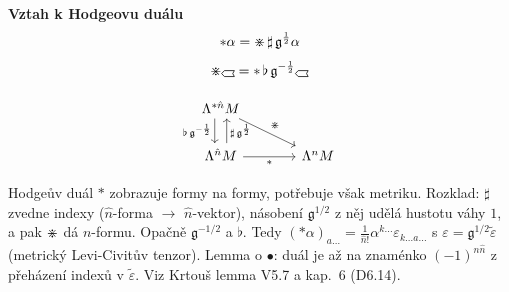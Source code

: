 \begin{minipage}{0.5\textwidth}
\textbf{Vztah k Hodgeovu duálu}
\[
  *\alpha = \mathord{\divideontimes}\,\sharp\,\mathfrak{g}^{\frac12}\alpha
\]
\[
  \gmIhdual\gmIhustsym = *\,\flat\,\mathfrak{g}^{-\frac12}\gmIhustsym
\]
\end{minipage}
\begin{minipage}{0.45\textwidth}
\[
  \begin{tikzcd}[column sep=large]
    \Lambda^{*\hat n}M \arrow[d, shift right=1ex, "\flat\,\mathfrak{g}^{-\frac12}"'] \arrow[rd, "\gmIhdual"] & \\
    \Lambda^{\hat n}M \arrow[u, shift right=1ex, "\sharp\,\mathfrak{g}^{\frac12}"'] \arrow[r, "*"'] & \Lambda^nM
  \end{tikzcd}
\]
\end{minipage}

\begin{vysvetleni}
Hodgeův duál $*$ zobrazuje formy na formy, potřebuje však metriku. Rozklad: $\sharp$ zvedne indexy ($\hat n$-forma $\to$ $\hat n$-vektor),
násobení $\mathfrak g^{1/2}$ z něj udělá hustotu váhy $1$, a pak $\mathord{\divideontimes}$ dá $n$-formu. Opačně $\mathfrak g^{-1/2}$ a $\flat$.
Tedy $(*\alpha)_{a\dots} = \frac{1}{\hat n!}\alpha^{k\dots}\varepsilon_{k\dots a\dots}$ s $\varepsilon = \mathfrak g^{1/2}\tilde\varepsilon$
(metrický Levi-Civitův tenzor). Lemma o $\bullet$: duál je  až na znaménko $(-1)^{n\hat n}$ z přeházení indexů v $\tilde\varepsilon$.
Viz Krtouš lemma V5.7 a kap.~6 (D6.14).
\end{vysvetleni}

